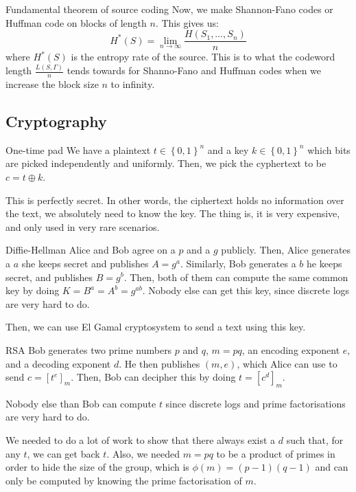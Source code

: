 \documentclass[a4paper]{article}
\begin{document}
\begin{parag}{Fundamental theorem of source coding}
    Now, we make Shannon-Fano codes or Huffman code on blocks of length $n$. This gives us: 
    \[H^*\left(S\right) = \lim_{n \to \infty} \frac{H\left(S_1, \ldots, S_n\right)}{n}\]
    where $H^*\left(S\right)$ is the entropy rate of the source. This is to what the codeword length $\frac{L\left(S, \Gamma\right)}{n}$ tends towards for Shanno-Fano and Huffman codes when we increase the block size $n$ to infinity.
\end{parag}

\subsection{Cryptography}
\begin{parag}{One-time pad}
    We have a plaintext $t \in \left\{0, 1\right\}^n$ and a key $k \in \left\{0, 1\right\}^n$ which bits are picked independently and uniformly. Then, we pick the cyphertext to be $c = t \oplus k$.

    This is perfectly secret. In other words, the ciphertext holds no information over the text, we absolutely need to know the key. The thing is, it is very expensive, and only used in very rare scenarios.
\end{parag}

\begin{parag}{Diffie-Hellman}
    Alice and Bob agree on a $p$ and a $g$ publicly. Then, Alice generates a $a$ she keeps secret and publishes $A = g^a$. Similarly, Bob generates a $b$ he keeps secret, and publishes $B = g^b$. Then, both of them can compute the same common key by doing $K = B^a = A^b = g^{ab}$. Nobody else can get this key, since discrete logs are very hard to do.


    Then, we can use El Gamal cryptosystem to send a text using this key.
\end{parag}

\begin{parag}{RSA}
    Bob generates two prime numbers $p$ and $q$, $m = pq$, an encoding exponent $e$, and a decoding exponent $d$. He then publishes $\left(m, e\right)$, which Alice can use to send $c = \left[t^e\right]_m$. Then, Bob can decipher this by doing $t = \left[c^d\right]_m$.

    Nobody else than Bob can compute $t$ since discrete logs and prime factorisations are very hard to do.


    We needed to do a lot of work to show that there always exist a $d$ such that, for any $t$, we can get back $t$. Also, we needed $m = pq$ to be a product of primes in order to hide the size of the group, which is $\phi\left(m\right) = \left(p-1\right)\left(q-1\right)$ and can only be computed by knowing the prime factorisation of $m$.
\end{parag}
\end{document}
